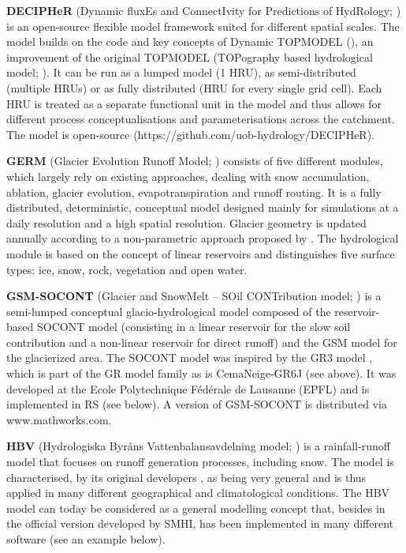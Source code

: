 \documentclass[10pt,a4paper]{article}
\begin{document}
\textbf{DECIPHeR} (Dynamic fluxEs and ConnectIvity for Predictions of HydRology; \citealp{Coxon2019}) is an open-source flexible model framework suited for different spatial scales. The model builds on the code and key concepts of Dynamic TOPMODEL (\citealp{Beven2001}), an improvement of the original TOPMODEL (TOPography based hydrological model; \citealp{Beven1979}). It can be run as a lumped model (1 HRU), as semi-distributed (multiple HRUs) or as fully distributed (HRU for every single grid cell). Each HRU is treated as a separate functional unit in the model and thus allows for different process conceptualisations and parameterisations across the catchment. The model is open-source (https://github.com/uob-hydrology/DECIPHeR).

\textbf{GERM} (Glacier Evolution Runoff Model; \citealt{Huss2016, Farinotti2012}) consists of five different modules, which largely rely on existing approaches, dealing with snow accumulation, ablation, glacier evolution, evapotranspiration and runoff routing. It is a fully distributed, deterministic, conceptual model designed mainly for simulations at a daily resolution and a high spatial resolution. Glacier geometry is updated annually according to a non-parametric approach proposed by \citet{Huss2010}. The hydrological module is based on the concept of linear reservoirs and distinguishes five surface types: ice, snow, rock, vegetation and open water. 

\textbf{GSM-SOCONT} (Glacier and SnowMelt -- SOil CONTribution model; \citealp{Schaefli2005c}) is a semi-lumped conceptual glacio-hydrological model composed of the reservoir-based SOCONT model (consisting in a linear reservoir for the slow soil contribution and a non-linear reservoir for direct runoff) and the GSM model for the glacierized area. The SOCONT model was inspired by the GR3 model \citep{Edijatno1989}, which is part of the GR model family as is CemaNeige-GR6J (see above). It was developed at the Ecole Polytechnique Fédérale de Lausanne (EPFL) and is implemented in RS (see below). A version of GSM-SOCONT is distributed via www.mathworks.com.

\textbf{HBV} (Hydrologiska Byråns Vattenbalansavdelning model; \citealp{Bergstrom1976a, Bergstrom1992, Bergstrom1995, Lindstrm1997})  is a rainfall-runoff model that focuses on runoff generation processes, including snow. The model is characterised, by its original developers \citep{Bergstrom1992}, as being very general and is thus applied in many different geographical and climatological conditions. The HBV model can today be considered as a general modelling concept that, besides in the official version developed by SMHI, has been implemented in many different software (see an example below).  
\end{document}

